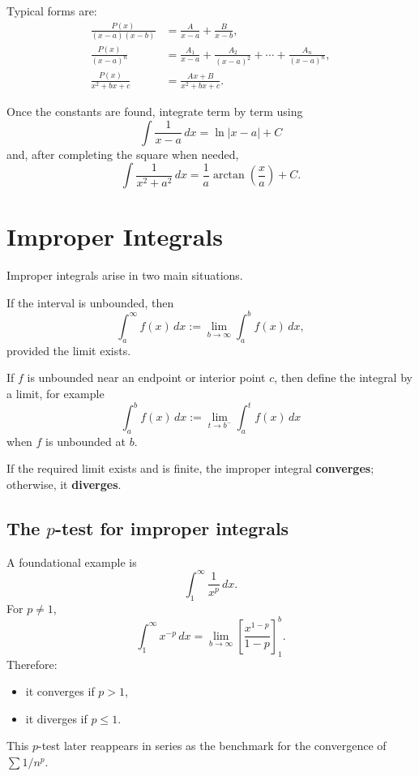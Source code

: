 Typical forms are:
\begin{align*}
\frac{P(x)}{(x-a)(x-b)} &= \frac{A}{x-a}+\frac{B}{x-b}, \\
\frac{P(x)}{(x-a)^n} &= \frac{A_1}{x-a}+\frac{A_2}{(x-a)^2}+\cdots+\frac{A_n}{(x-a)^n}, \\
\frac{P(x)}{x^2+bx+c} &= \frac{Ax+B}{x^2+bx+c}.
\end{align*}

Once the constants are found, integrate term by term using
$$\int \frac{1}{x-a}\,dx = \ln|x-a|+C$$
and, after completing the square when needed,
$$\int \frac{1}{x^2+a^2}\,dx = \frac{1}{a}\arctan\!\left(\frac{x}{a}\right)+C.$$ 

\section*{Improper Integrals}

Improper integrals arise in two main situations.

\begin{definition}
If the interval is unbounded, then
$$\int_a^{\infty} f(x)\,dx := \lim_{b\to\infty}\int_a^b f(x)\,dx,$$
provided the limit exists.
\end{definition}

\begin{definition}
If $f$ is unbounded near an endpoint or interior point $c$, then define the integral by a limit, for example
$$\int_a^b f(x)\,dx := \lim_{t\to b^-}\int_a^t f(x)\,dx$$
when $f$ is unbounded at $b$.
\end{definition}

If the required limit exists and is finite, the improper integral \textbf{converges}; otherwise, it \textbf{diverges}.

\subsection*{The $p$-test for improper integrals}

A foundational example is
$$\int_1^{\infty} \frac{1}{x^p}\,dx.$$ 
For $p\neq 1$,
$$\int_1^{\infty} x^{-p}\,dx = \lim_{b\to\infty}\left[\frac{x^{1-p}}{1-p}\right]_1^b.$$ 
Therefore:
\begin{itemize}
    \item it converges if $p>1$,
    \item it diverges if $p\le 1$.
\end{itemize}

\begin{remark}
This $p$-test later reappears in series as the benchmark for the convergence of $\sum 1/n^p$.
\end{remark}